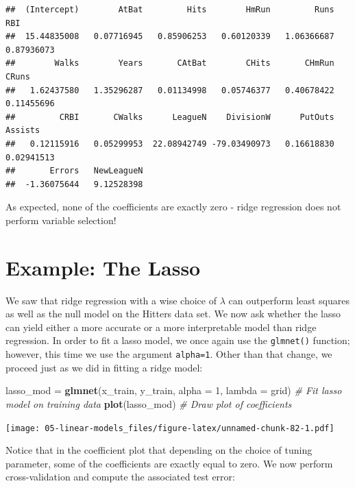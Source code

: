 \documentclass[
  openany]{book}
\newenvironment{Shaded}{\begin{snugshade}}{\end{snugshade}}
\newcommand{\CommentTok}[1]{\textcolor[rgb]{0.56,0.35,0.01}{\textit{#1}}}
\newcommand{\DataTypeTok}[1]{\textcolor[rgb]{0.13,0.29,0.53}{#1}}
\newcommand{\DecValTok}[1]{\textcolor[rgb]{0.00,0.00,0.81}{#1}}
\newcommand{\KeywordTok}[1]{\textcolor[rgb]{0.13,0.29,0.53}{\textbf{#1}}}
\newcommand{\NormalTok}[1]{#1}
\newcommand{\StringTok}[1]{\textcolor[rgb]{0.31,0.60,0.02}{#1}}
\begin{document}
\begin{verbatim}
##  (Intercept)        AtBat         Hits        HmRun         Runs          RBI 
##  15.44835008   0.07716945   0.85906253   0.60120339   1.06366687   0.87936073 
##        Walks        Years       CAtBat        CHits       CHmRun        CRuns 
##   1.62437580   1.35296287   0.01134998   0.05746377   0.40678422   0.11455696 
##         CRBI       CWalks      LeagueN    DivisionW      PutOuts      Assists 
##   0.12115916   0.05299953  22.08942749 -79.03490973   0.16618830   0.02941513 
##       Errors   NewLeagueN 
##  -1.36075644   9.12528398
\end{verbatim}

As expected, none of the coefficients are exactly zero - ridge regression does not
perform variable selection!

\hypertarget{example-the-lasso}{%
\section{Example: The Lasso}\label{example-the-lasso}}

We saw that ridge regression with a wise choice of \(\lambda\) can outperform least
squares as well as the null model on the Hitters data set. We now ask
whether the lasso can yield either a more accurate or a more interpretable
model than ridge regression. In order to fit a lasso model, we once again
use the \texttt{glmnet()} function; however, this time we use the argument \texttt{alpha=1}.
Other than that change, we proceed just as we did in fitting a ridge model:

\begin{Shaded}
\begin{Highlighting}[]
\NormalTok{lasso_mod =}\StringTok{ }\KeywordTok{glmnet}\NormalTok{(x_train, y_train, }\DataTypeTok{alpha =} \DecValTok{1}\NormalTok{, }\DataTypeTok{lambda =}\NormalTok{ grid) }\CommentTok{# Fit lasso model on training data}
\KeywordTok{plot}\NormalTok{(lasso_mod)                                          }\CommentTok{# Draw plot of coefficients}
\end{Highlighting}
\end{Shaded}

\texttt{[image: 05-linear-models\_files/figure-latex/unnamed-chunk-82-1.pdf]}

Notice that in the coefficient plot that depending on the choice of tuning
parameter, some of the coefficients are exactly equal to zero. We now
perform cross-validation and compute the associated test error:
\end{document}
